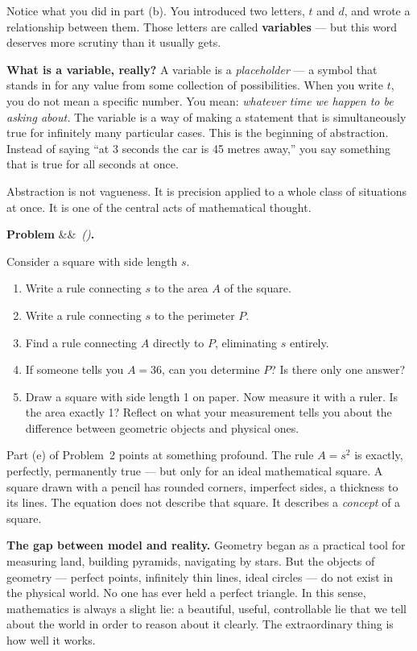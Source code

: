 \documentclass[12pt, a4paper]{article}
\newcounter{problem}
\newenvironment{problem}[1][]{%
  \refstepcounter{problem}%
  \par\vspace{6pt}%
  \noindent\textbf{\color{MidBlue}Problem \theproblem}%
  \ifx&#1&\else\ \textit{(#1)}\fi\textbf{.}\enskip
}{\par\vspace{4pt}}
\begin{document}
\medskip
Notice what you did in part (b). You introduced two letters, $t$ and $d$, and wrote a relationship between them. Those letters are called \textbf{variables} --- but this word deserves more scrutiny than it usually gets.

\begin{thought}
\textbf{What is a variable, really?}
A variable is a \emph{placeholder} --- a symbol that stands in for any value from some collection of possibilities. When you write $t$, you do not mean a specific number. You mean: \textit{whatever time we happen to be asking about.} The variable is a way of making a statement that is simultaneously true for infinitely many particular cases. This is the beginning of abstraction. Instead of saying ``at 3 seconds the car is 45 metres away,'' you say something that is true for all seconds at once.

Abstraction is not vagueness. It is precision applied to a whole class of situations at once. It is one of the central acts of mathematical thought.
\end{thought}

\begin{problem}
Consider a square with side length $s$.
\begin{enumerate}[label=(\alph*), topsep=2pt]
  \item Write a rule connecting $s$ to the area $A$ of the square.
  \item Write a rule connecting $s$ to the perimeter $P$.
  \item Find a rule connecting $A$ directly to $P$, eliminating $s$ entirely.
  \item If someone tells you $A = 36$, can you determine $P$? Is there only one answer?
  \item Draw a square with side length 1 on paper. Now measure it with a ruler. Is the area exactly 1? Reflect on what your measurement tells you about the difference between geometric objects and physical ones.
\end{enumerate}
\end{problem}

Part (e) of Problem~2 points at something profound. The rule $A = s^2$ is exactly, perfectly, permanently true --- but only for an ideal mathematical square. A square drawn with a pencil has rounded corners, imperfect sides, a thickness to its lines. The equation does not describe that square. It describes a \emph{concept} of a square.

\begin{thought}
\textbf{The gap between model and reality.}
Geometry began as a practical tool for measuring land, building pyramids, navigating by stars. But the objects of geometry --- perfect points, infinitely thin lines, ideal circles --- do not exist in the physical world. No one has ever held a perfect triangle. In this sense, mathematics is always a slight lie: a beautiful, useful, controllable lie that we tell about the world in order to reason about it clearly. The extraordinary thing is how well it works.
\end{thought}
\end{document}
